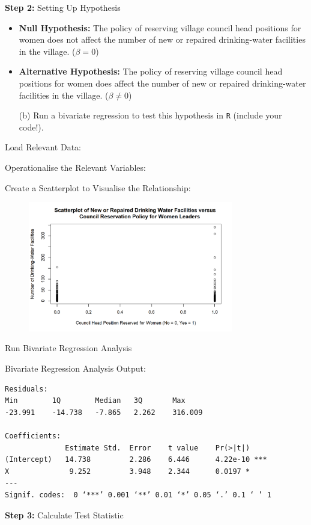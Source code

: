 \documentclass[12pt,letterpaper]{article}
\begin{document}
\noindent\textbf{Step 2:} Setting Up Hypothesis
\begin{itemize}
	\item 
	\textbf{Null Hypothesis:} The policy of reserving village council head positions for women does not affect the number of new or repaired drinking-water facilities in the village. ($\beta = 0$)
	\item
	\textbf{Alternative Hypothesis:} The policy of reserving village council head positions for women does affect the number of new or repaired drinking-water facilities in the village. ($\beta \neq 0$)
\end{itemize}

\newpage
\begin{enumerate}
	\item [(b)] Run a bivariate regression to test this hypothesis in \texttt{R} (include your code!).
\end{enumerate}
\vspace{.5cm}
\noindent Load Relevant Data: 

\vspace{.5cm}
\noindent Operationalise the Relevant Variables:

\vspace{.5cm}
\noindent Create a Scatterplot to Visualise the Relationship: 


\begin{figure}[H]
	\centering
	\includegraphics[width=0.8\textwidth]{Figure_2_1.png}
\end{figure}

\noindent Run Bivariate Regression Analysis 


\noindent Bivariate Regression Analysis Output:
\begin{verbatim}
Residuals:
Min        1Q        Median   3Q       Max 
-23.991    -14.738   -7.865   2.262    316.009 

Coefficients:
              Estimate Std.  Error    t value    Pr(>|t|)    
(Intercept)   14.738         2.286    6.446      4.22e-10 ***
X              9.252         3.948    2.344      0.0197 *  
---
Signif. codes:  0 ‘***’ 0.001 ‘**’ 0.01 ‘*’ 0.05 ‘.’ 0.1 ‘ ’ 1
\end{verbatim}
\vspace{.5cm}
\noindent\textbf{Step 3:} Calculate Test Statistic
\end{document}
